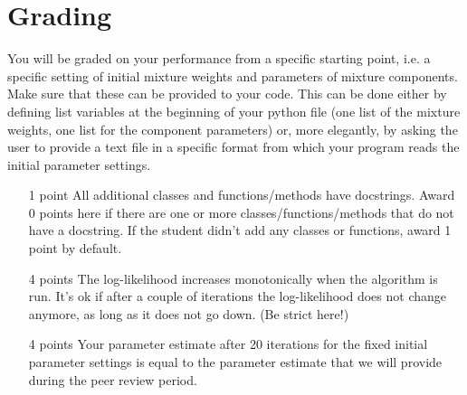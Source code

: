 \documentclass[11pt, leqno, a4paper]{article}
\begin{document}
\section{Grading}

You will be graded on your performance from a specific starting point, i.e. a specific setting of initial mixture weights and parameters of mixture components.
Make sure that these can be provided to your code. This can be done either by defining list variables at the beginning of your python file (one list of the
mixture weights, one list for the component parameters) or, more elegantly, by asking the user to provide a text file in a specific format from which your program
reads the initial parameter settings.

\begin{itemize}
\item[1 point] All additional classes and functions/methods have docstrings. Award 0 points here if there are one or more classes/functions/methods that do not have a 
docstring. If the student didn't add any classes or functions, award 1 point by default.
\item[4 points] The log-likelihood increases monotonically when the algorithm is run. It's ok if after a couple of iterations the log-likelihood
does not change anymore, as long as it does not go down. (Be strict here!)
\item[4 points] Your parameter estimate after 20 iterations for the fixed initial parameter settings is equal to the parameter estimate that we will provide during the 
peer review period.
\end{itemize}
\end{document}
